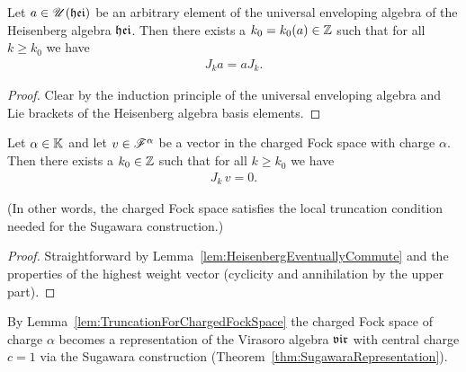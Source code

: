 \begin{lemma}
  \label{lem:HeisenbergEventuallyCommute}
  \leanok
  Let $a \in \mathscr{U}(\mathfrak{hei})$ be an arbitrary element of the universal enveloping
  algebra of the Heisenberg algebra $\mathfrak{hei}$. Then there exists a $k_0=k_0(a) \in \mathbb{Z}$
  such that for all $k \ge k_0$ we have
  \begin{align*}
    J_k a = a J_k .
  \end{align*}
\end{lemma}
\begin{proof}
  \leanok
  Clear by the induction principle of the universal enveloping algebra and
  Lie brackets of the Heisenberg algebra basis elements.
\end{proof}

\begin{lemma}
  \label{lem:TruncationForChargedFockSpace}
  \leanok
  Let $\alpha \in \mathbb{K}$ and let $v \in \mathscr{F}^{\alpha}$ be a vector in
  the charged Fock space with charge $\alpha$.
  Then there exists a $k_0 \in \mathbb{Z}$ such that for all $k \ge k_0$ we have
  \begin{align*}
    J_k \, v = 0 .
  \end{align*}

  (In other words, the charged Fock space satisfies the local truncation condition
  \tagHeiTrunc{} needed for the Sugawara construction.)
\end{lemma}
\begin{proof}
  \leanok
  Straightforward by Lemma~\ref{lem:HeisenbergEventuallyCommute}
  and the properties of the highest weight vector
  (cyclicity and annihilation by the upper part).
\end{proof}

\begin{definition}
  \label{def:ChargedFockSpaceSugawara}
  \leanok
  By Lemma~\ref{lem:TruncationForChargedFockSpace}
  the charged Fock space of charge $\alpha$
  becomes a representation of the Virasoro algebra
  $\mathfrak{vir}$ with central charge $c = 1$ via the Sugawara construction
  (Theorem~\ref{thm:SugawaraRepresentation}).
\end{definition}

